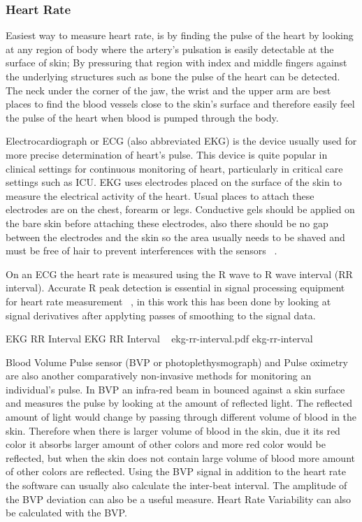 \subsubsection{Heart Rate}
Easiest way to measure heart rate, is by finding the pulse of the heart by looking at any region of body where the artery's pulsation is easily detectable at the surface of skin; By pressuring that region with index and middle fingers against the underlying structures such as bone the pulse of the heart can be detected. The neck under the corner of the jaw, the wrist and the upper arm are best places to find the blood vessels close to the skin's surface and therefore easily feel the pulse of the heart when blood is pumped through the body.

Electrocardiograph or ECG (also abbreviated EKG) is the device usually used for more precise determination of heart's pulse. This device is quite popular in clinical settings for continuous monitoring of heart, particularly in critical care settings such as ICU. EKG uses electrodes placed on the surface of the skin to measure the electrical activity of the heart. Usual places to attach these electrodes are on the chest, forearm or legs. Conductive gels should be applied on the bare skin before attaching these electrodes, also there should be no gap between the electrodes and the skin so the area usually needs to be shaved and must be free of hair to prevent interferences with the sensors ~\cite{stern2001psychophysiological}.

On an ECG the heart rate is measured using the R wave to R wave interval (RR interval). Accurate R peak detection is essential in signal processing equipment for heart rate measurement ~\cite{pise2011thinkquest}, in this work this has been done by looking at signal derivatives after applyting passes of smoothing to the signal data.

\img
{EKG RR Interval}
{EKG RR Interval ~\cite{wiki2014bvp}}
{ekg-rr-interval.pdf}
{ekg-rr-interval}

Blood Volume Pulse sensor (BVP or photoplethysmograph) and Pulse oximetry are also another comparatively non-invasive methods for monitoring an individual's pulse. In BVP an infra-red beam in bounced against a skin surface and measures the pulse by looking at the amount of reflected light. The reflected amount of light would change by passing through different volume of blood in the skin. Therefore when there is larger volume of blood in the skin, due it its red color it absorbs larger amount of other colors and more red color would be reflected, but when the skin does not contain large volume of blood more amount of other colors are reflected. Using the BVP signal in addition to the heart rate the software can usually also calculate the inter-beat interval. The amplitude of the BVP deviation can also be a useful measure. Heart Rate Variability can also be calculated with the BVP.

